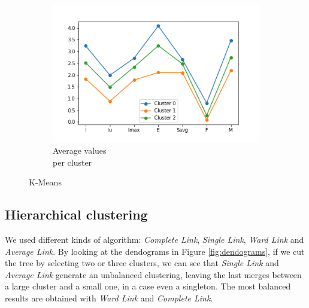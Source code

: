 \begin{figure}[h!]
\begin{subfigure}{0.32\textwidth}
        \includegraphics[width=\textwidth]{img/clustering/cluster_avg.png}
	\caption{Average values\\ per cluster}
        \label{fig:cluster_avg}
    \end{subfigure}
\caption{K-Means}
\end{figure}

\vspace{-5mm}
\subsection{Hierarchical clustering}
We used different kinds of algorithm: \emph{Complete Link}, \emph{Single Link}, \emph{Ward Link} and \emph{Average Link}. By looking at the dendograms in Figure \ref{fig:dendograms}, if we cut the tree by selecting two or three clusters, we can see that \emph{Single Link} and \emph{Average Link} generate an unbalanced clustering, leaving the last merges between a large cluster and a small one, in a case even a singleton. The most balanced results are obtained with \emph{Ward Link} and \emph{Complete Link}.

